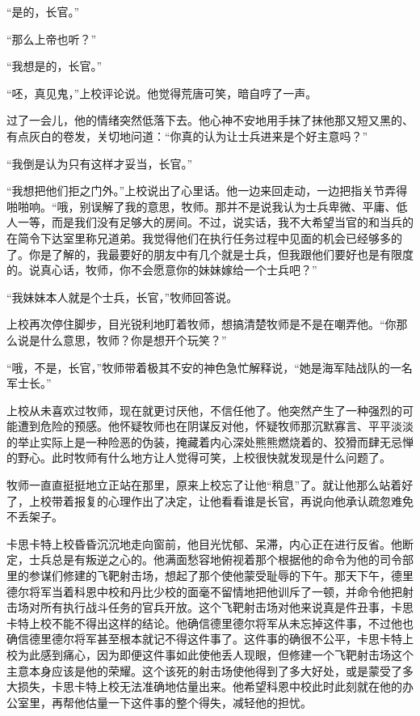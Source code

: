     “是的，长官。”

    “那么上帝也听？”

    “我想是的，长官。”

    “呸，真见鬼，”上校评论说。他觉得荒唐可笑，暗自哼了一声。

    过了一会儿，他的情绪突然低落下去。他心神不安地用手抹了抹他那又短又黑的、有点灰白的卷发，关切地问道：“你真的认为让士兵进来是个好主意吗？”

    “我倒是认为只有这样才妥当，长官。”

    “我想把他们拒之门外。”上校说出了心里话。他一边来回走动，一边把指关节弄得啪啪响。“哦，别误解了我的意思，牧师。那并不是说我认为士兵卑微、平庸、低人一等，而是我们没有足够大的房间。不过，说实话，我不大希望当官的和当兵的在简令下达室里称兄道弟。我觉得他们在执行任务过程中见面的机会已经够多的了。你是了解的，我最要好的朋友中有几个就是士兵，但我跟他们要好也是有限度的。说真心话，牧师，你不会愿意你的妹妹嫁给一个士兵吧？”

    “我妹妹本人就是个士兵，长官，”牧师回答说。

    上校再次停住脚步，目光锐利地盯着牧师，想搞清楚牧师是不是在嘲弄他。“你那么说是什么意思，牧师？你是想开个玩笑？”

    “哦，不是，长官，”牧师带着极其不安的神色急忙解释说，“她是海军陆战队的一名军士长。”

    上校从未喜欢过牧师，现在就更讨厌他，不信任他了。他突然产生了一种强烈的可能遭到危险的预感。他怀疑牧师也在阴谋反对他，怀疑牧师那沉默寡言、平平淡淡的举止实际上是一种险恶的伪装，掩藏着内心深处熊熊燃烧着的、狡猾而肆无忌惮的野心。此时牧师有什么地方让人觉得可笑，上校很快就发现是什么问题了。

    牧师一直直挺挺地立正站在那里，原来上校忘了让他“稍息”了。就让他那么站着好了，上校带着报复的心理作出了决定，让他看看谁是长官，再说向他承认疏忽难免不丢架子。

    卡思卡特上校昏昏沉沉地走向窗前，他目光忧郁、呆滞，内心正在进行反省。他断定，士兵总是有叛逆之心的。他满面愁容地俯视着那个根据他的命令为他的司令部里的参谋们修建的飞靶射击场，想起了那个使他蒙受耻辱的下午。那天下午，德里德尔将军当着科恩中校和丹比少校的面毫不留情地把他训斥了一顿，并命令他把射击场对所有执行战斗任务的官兵开放。这个飞靶射击场对他来说真是件丑事，卡思卡特上校不能不得出这样的结论。他确信德里德尔将军从未忘掉这件事，不过他也确信德里德尔将军甚至根本就记不得这件事了。这件事的确很不公平，卡思卡特上校为此感到痛心，因为即便这件事如此使他丢人现眼，但修建一个飞靶射击场这个主意本身应该是他的荣耀。这个该死的射击场使他得到了多大好处，或是蒙受了多大损失，卡思卡特上校无法准确地估量出来。他希望科恩中校此时此刻就在他的办公室里，再帮他估量一下这件事的整个得失，减轻他的担忧。

